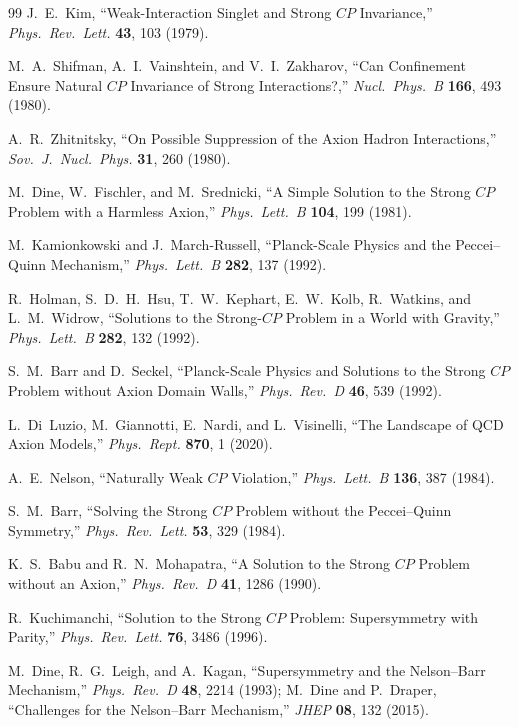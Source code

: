 \documentclass[11pt,a4paper]{article}
\begin{document}
\begin{thebibliography}{99}
J.~E.~Kim, ``Weak-Interaction Singlet and Strong $CP$ Invariance,'' \emph{Phys.\ Rev.\ Lett.} \textbf{43}, 103 (1979).

M.~A.~Shifman, A.~I.~Vainshtein, and V.~I.~Zakharov, ``Can Confinement Ensure Natural $CP$ Invariance of Strong Interactions?,'' \emph{Nucl.\ Phys.\ B} \textbf{166}, 493 (1980).

A.~R.~Zhitnitsky, ``On Possible Suppression of the Axion Hadron Interactions,'' \emph{Sov.\ J.\ Nucl.\ Phys.} \textbf{31}, 260 (1980).

M.~Dine, W.~Fischler, and M.~Srednicki, ``A Simple Solution to the Strong $CP$ Problem with a Harmless Axion,'' \emph{Phys.\ Lett.\ B} \textbf{104}, 199 (1981).

M.~Kamionkowski and J.~March-Russell, ``Planck-Scale Physics and the Peccei--Quinn Mechanism,'' \emph{Phys.\ Lett.\ B} \textbf{282}, 137 (1992).

R.~Holman, S.~D.~H.~Hsu, T.~W.~Kephart, E.~W.~Kolb, R.~Watkins, and L.~M.~Widrow, ``Solutions to the Strong-$CP$ Problem in a World with Gravity,'' \emph{Phys.\ Lett.\ B} \textbf{282}, 132 (1992).

S.~M.~Barr and D.~Seckel, ``Planck-Scale Physics and Solutions to the Strong $CP$ Problem without Axion Domain Walls,'' \emph{Phys.\ Rev.\ D} \textbf{46}, 539 (1992).

L.~Di~Luzio, M.~Giannotti, E.~Nardi, and L.~Visinelli, ``The Landscape of QCD Axion Models,'' \emph{Phys.\ Rept.} \textbf{870}, 1 (2020).

A.~E.~Nelson, ``Naturally Weak $CP$ Violation,'' \emph{Phys.\ Lett.\ B} \textbf{136}, 387 (1984).

S.~M.~Barr, ``Solving the Strong $CP$ Problem without the Peccei--Quinn Symmetry,'' \emph{Phys.\ Rev.\ Lett.} \textbf{53}, 329 (1984).

K.~S.~Babu and R.~N.~Mohapatra, ``A Solution to the Strong $CP$ Problem without an Axion,'' \emph{Phys.\ Rev.\ D} \textbf{41}, 1286 (1990).

R.~Kuchimanchi, ``Solution to the Strong $CP$ Problem: Supersymmetry with Parity,'' \emph{Phys.\ Rev.\ Lett.} \textbf{76}, 3486 (1996).

M.~Dine, R.~G.~Leigh, and A.~Kagan, ``Supersymmetry and the Nelson--Barr Mechanism,'' \emph{Phys.\ Rev.\ D} \textbf{48}, 2214 (1993); M.~Dine and P.~Draper, ``Challenges for the Nelson--Barr Mechanism,'' \emph{JHEP} \textbf{08}, 132 (2015).


\end{thebibliography}
\end{document}
